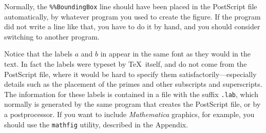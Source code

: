 Normally, the \verb+%%BoundingBox+ line should have been placed in the
PostScript file automatically, by whatever program you used to create
the figure.  If the program did not write a line like that, you have
to do it by hand, and you should consider switching to another program.

Notice that the labels $a$ and $b$ in  appear in
the same font as they would in the text.  In fact the labels were
typeset by \TeX\ itself, and do not come from the PostScript file,
where it would be hard to specify them satisfactorily---especially
details such as the placement of the primes and other subscripts and
superscripts.  The information for these labels is contained in a file
with the suffix \verb+.lab+, which normally is generated by the same
program that creates the PostScript file, or by a postprocessor.
If you want to include {\it Mathematica} graphics, for example, you
should use the \verb+mathfig+ utility, described in the Appendix.

